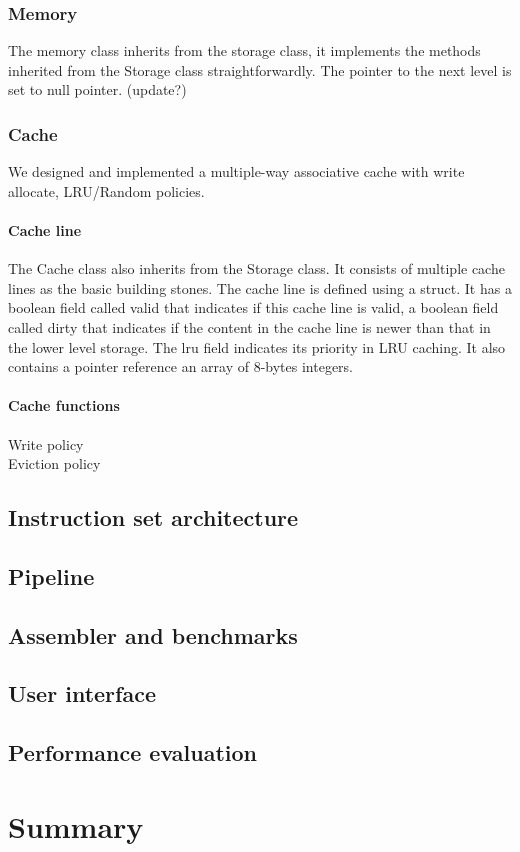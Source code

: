 \documentclass{sig-alternate}
\newcommand{\subparagraph}{}
\begin{document}
\subsubsection{Memory}
The memory class inherits from the storage class, it implements the methods inherited from the Storage class straightforwardly. The pointer to the next level is set to null pointer. (update?)
\subsubsection{Cache}
We designed and implemented a multiple-way associative cache with write allocate, LRU/Random policies. 
\paragraph{Cache line}
The Cache class also inherits from the Storage class. It consists of multiple cache lines as the basic building stones. The cache line is defined using a struct. It has a boolean field called valid that indicates if this cache line is valid, a boolean field called dirty that indicates if the content in the cache line is newer than that in the lower level storage. The lru field indicates its priority in LRU caching. It also contains a pointer reference an array of 8-bytes integers.

\paragraph{Cache functions}
\subparagraph{Write policy}
\\
\subparagraph{Eviction policy}


\subsection{Instruction set architecture}
\subsection{Pipeline}
\subsection{Assembler and benchmarks}
\subsection{User interface}
\subsection{Performance evaluation}
\section{Summary}
\end{document}
